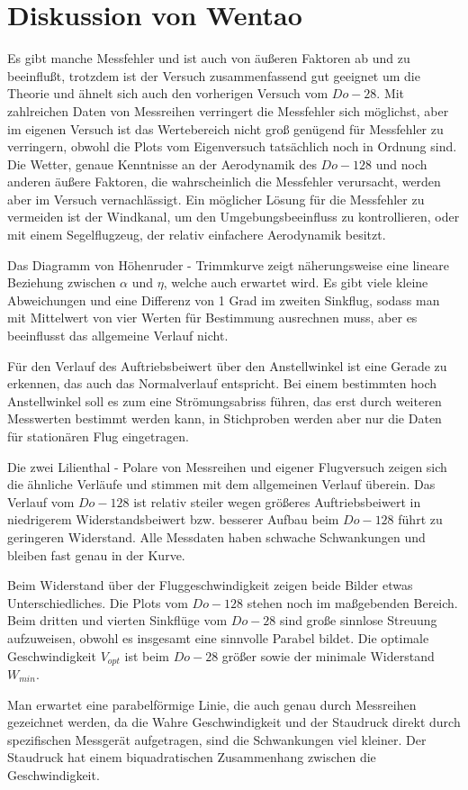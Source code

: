 \section{Diskussion von Wentao}
 Es gibt manche Messfehler und ist auch von äußeren Faktoren ab und zu beeinflußt, trotzdem ist der Versuch zusammenfassend gut geeignet um die Theorie und ähnelt sich auch den vorherigen Versuch vom $Do - 28$. Mit zahlreichen Daten von Messreihen verringert die Messfehler sich möglichst, aber im eigenen Versuch ist das Wertebereich nicht groß genügend für Messfehler zu verringern, obwohl die Plots vom Eigenversuch tatsächlich noch in Ordnung sind. Die Wetter, genaue Kenntnisse an der Aerodynamik des $Do -128$ und noch anderen äußere Faktoren, die wahrscheinlich die Messfehler verursacht, werden aber im Versuch vernachlässigt. Ein möglicher Lösung für die Messfehler zu vermeiden ist der Windkanal, um den Umgebungsbeeinfluss zu kontrollieren, oder mit einem Segelflugzeug, der relativ einfachere Aerodynamik besitzt.

Das Diagramm von Höhenruder - Trimmkurve zeigt näherungsweise eine lineare Beziehung zwischen $\alpha$ und $\eta$, welche auch erwartet wird. Es gibt viele kleine Abweichungen und eine Differenz von 1 Grad im zweiten Sinkflug, sodass man mit Mittelwert von vier Werten für Bestimmung ausrechnen muss, aber es beeinflusst das allgemeine Verlauf nicht.

Für den Verlauf des Auftriebsbeiwert über den Anstellwinkel ist eine Gerade zu erkennen, das auch das Normalverlauf entspricht. Bei einem bestimmten hoch Anstellwinkel soll es zum eine Strömungsabriss führen, das erst durch weiteren Messwerten bestimmt werden kann, in Stichproben werden aber nur die Daten für stationären Flug eingetragen.

Die zwei Lilienthal - Polare von Messreihen und eigener Flugversuch zeigen sich die ähnliche Verläufe und stimmen mit dem allgemeinen Verlauf überein. Das Verlauf vom $Do - 128$ ist relativ steiler wegen größeres Auftriebsbeiwert in niedrigerem Widerstandsbeiwert bzw. besserer Aufbau beim $Do - 128$ führt zu geringeren Widerstand. Alle Messdaten haben schwache Schwankungen und bleiben fast genau in der Kurve.

Beim Widerstand über der Fluggeschwindigkeit zeigen beide Bilder etwas Unterschiedliches. Die Plots vom $Do - 128$ stehen noch im maßgebenden Bereich. Beim dritten und vierten Sinkflüge vom $Do - 28$ sind große sinnlose Streuung aufzuweisen, obwohl es insgesamt eine sinnvolle Parabel bildet. Die optimale Geschwindigkeit $V_{opt}$ ist beim $Do - 28$ größer sowie der minimale Widerstand $W_{min}$.

Man erwartet eine parabelförmige Linie, die auch genau durch Messreihen gezeichnet werden, da die Wahre Geschwindigkeit und der Staudruck direkt durch spezifischen Messgerät aufgetragen, sind die Schwankungen viel kleiner. Der Staudruck hat einem biquadratischen Zusammenhang zwischen die Geschwindigkeit.
\newpage